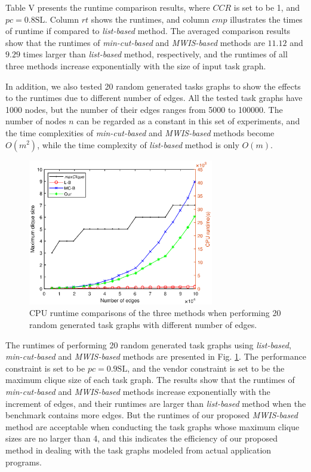 \documentclass[10pt,journal]{IEEEtran}
\begin{document}
Table V presents the runtime comparison results, where $CCR$ is set to be 1, and $pc=0.8\mathrm{SL}$. Column $rt$ shows the runtimes, and column $cmp$ illustrates the times of runtime if compared to \textit{list-based} method. The averaged comparison results show that the runtimes of \textit{min-cut-based} and \textit{MWIS-based} methods are $11.12$ and $9.29$ times larger than \textit{list-based} method, respectively, and the runtimes of all three methods increase exponentially with the size of input task graph.

In addition, we also tested 20 random generated tasks graphs to show the effects to the runtimes due to different number of edges. All the tested task graphs have 1000 nodes, but the number of their edges ranges from 5000 to 100000. The number of nodes $n$ can be regarded as a constant in this set of experiments, and the time complexities of \textit{min-cut-based} and \textit{MWIS-based} methods become $O(m^2)$, while the time complexity of \textit{list-based} method is only $O(m)$.
\begin{figure}[!h]
\centering
\hspace*{-1.2em}
\includegraphics[width=8.1cm]{figure/cpu_runtime.eps}
\caption{CPU runtime comparisons of the three methods when performing 20 random generated task graphs with different number of edges.}
\label{fig:cpu_runtime}
\end{figure}

The runtimes of performing 20 random generated task graphs using \textit{list-based}, \textit{min-cut-based} and \textit{MWIS-based} methods are presented in Fig. \ref{fig:cpu_runtime}. The performance constraint is set to be $pc=0.9\mathrm{SL}$, and the vendor constraint is set to be the maximum clique size of each task graph. The results show that the runtimes of \textit{min-cut-based} and \textit{MWIS-based} methods increase exponentially with the increment of edges, and their runtimes are larger than \textit{list-based} method when the benchmark contains more edges. But the runtimes of our proposed \textit{MWIS-based} method are acceptable when conducting the task graphs whose maximum clique sizes are no larger than 4, and this indicates the efficiency of our proposed method in dealing with the task graphs modeled from actual application programs.
\end{document}

